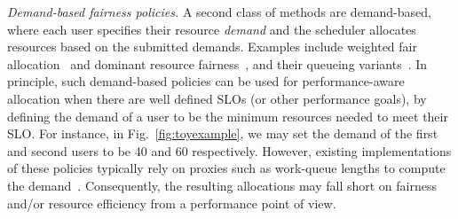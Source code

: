 \emph{Demand-based fairness policies.}
A second class of methods are demand-based, where each user specifies their resource
\emph{demand} and the scheduler allocates resources based on the submitted demands.
Examples include weighted fair allocation~\citep{demers1989analysis} and dominant resource
fairness~\citep{ghodsi2011dominant}, and their queueing
variants~\citep{waldspurger1994lottery,stiliadis1998latency,ghodsi2012multi}.
In principle, such demand-based policies can be used for performance-aware allocation when there are
well defined SLOs (or other performance goals), by defining the demand of a user to be the
minimum resources needed to meet their SLO.
For instance, in  Fig.~\ref{fig:toyexample}, we may set the demand of the first and
second users to be 40 and 60 respectively.
However, existing implementations of these policies typically rely on
proxies such as work-queue lengths
to compute the demand~\citep{bennett1996wf,mesos,ghodsi2013choosy}.
Consequently, the resulting allocations may fall short on fairness and/or resource efficiency from
a performance point of view.



